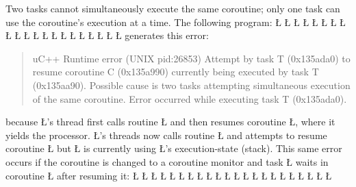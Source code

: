 \documentclass[openright,twoside]{report}
\begin{document}
Two tasks cannot simultaneously execute the same coroutine;
only one task can use the coroutine's execution at a time.
The following program:
\LGinlinefalse\LGbegin\lgrinde
\L{}
\L{\LB{}}
\L{\LB{}}
\L{\LB{}}
\L{}
\L{\LB{}}
\L{\LB{}}
\L{\LB{}}
\L{\LB{\};}}
\endlgrinde\LGend
\LGinlinefalse\LGbegin\lgrinde
\L{}
\L{\LB{}}
\L{\LB{}}
\L{\LB{}}
\L{\LB{}}
\L{}
\L{\LB{}}
\L{\LB{\};}}
\L{}
\L{\LB{}}
\L{\LB{}}
\L{\LB{\}}}
\endlgrinde\LGend
generates this error:
\begin{quote}
\BGfont
uC++ Runtime error (UNIX pid:26853) Attempt by task T (0x135ada0) to resume coroutine C (0x135a990) currently being executed by task T (0x135aa90).
Possible cause is two tasks attempting simultaneous execution of the same coroutine.
Error occurred while executing task T (0x135ada0).
\end{quote}
because \LGinlinetrue\LGbegin\lgrinde\L{}\endlgrinde\LGend{}'s thread first calls routine \LGinlinetrue\LGbegin\lgrinde\L{}\endlgrinde\LGend{} and then resumes coroutine \LGinlinetrue\LGbegin\lgrinde\L{}\endlgrinde\LGend{}, where it yields the processor.
\LGinlinetrue\LGbegin\lgrinde\L{}\endlgrinde\LGend{}'s threads now calls routine \LGinlinetrue\LGbegin\lgrinde\L{}\endlgrinde\LGend{} and attempts to resume coroutine \LGinlinetrue\LGbegin\lgrinde\L{}\endlgrinde\LGend{} but \LGinlinetrue\LGbegin\lgrinde\L{}\endlgrinde\LGend{} is currently using \LGinlinetrue\LGbegin\lgrinde\L{}\endlgrinde\LGend{}'s execution-state (stack).
This same error occurs if the coroutine is changed to a coroutine monitor and task \LGinlinetrue\LGbegin\lgrinde\L{}\endlgrinde\LGend{} waits in coroutine \LGinlinetrue\LGbegin\lgrinde\L{}\endlgrinde\LGend{} after resuming it:
\LGinlinefalse\LGbegin\lgrinde
\L{}
\L{\LB{}}
\L{\LB{}}
\L{\LB{}}
\L{\LB{}}
\L{}
\L{\LB{}}
\L{\LB{}}
\L{\LB{}}
\L{\LB{\};}}
\endlgrinde\LGend
\LGinlinefalse\LGbegin\lgrinde
\L{}
\L{\LB{}}
\L{\LB{}}
\L{\LB{}}
\L{\LB{}}
\L{}
\L{\LB{}}
\L{\LB{\};}}
\L{}
\L{\LB{}}
\L{\LB{}}
\L{\LB{\}}}
\endlgrinde\LGend
\end{document}
